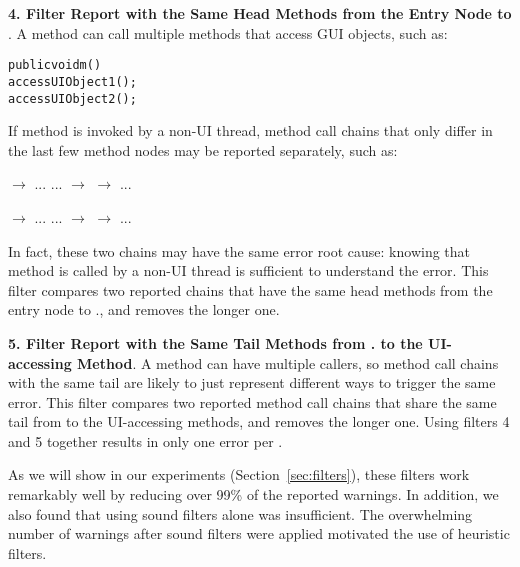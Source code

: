 \textbf{4. Filter Report with the Same Head Methods from the Entry Node to }. A method can call
multiple methods that access GUI objects, such as:

\pagebreak[3]
\vspace{-2mm}                   %
\begin{CodeOut}
\begin{alltt}
     public void m() \ttlcb
         accessUIObject1();
         accessUIObject2();
     \ttrcb
\end{alltt}
\end{CodeOut}
\vspace{-2mm}
If method  is invoked by a non-UI thread, method call chains that
only differ in the last few method nodes may be reported separately, such as:

 $\rightarrow$ ... ... $\rightarrow$  $\rightarrow$  ...

 $\rightarrow$ ... ... $\rightarrow$  $\rightarrow$  ...

In fact, these two chains may have the same error root cause: knowing that
method  is called by a non-UI thread is sufficient to understand
the error.
This filter compares two reported chains that have the same
head methods from the entry node to .,
and removes the longer one.

\textbf{5. Filter Report with the Same Tail Methods from .
to the UI-accessing Method}. A method
can have multiple callers, so method call chains with the same tail are likely
to just represent different ways to trigger the same error. This filter compares 
two reported method call chains that share the same 
tail from  to the UI-accessing methods, and
removes the longer one. Using filters 4 and 5 together results in
only one error per .



\vspace{1mm}

As we will show in our experiments (Section~\ref{sec:filters}), these filters
work remarkably well by reducing over 99\% of the reported warnings. In addition,
we also found that using sound filters alone was insufficient. The overwhelming
number of warnings after sound filters were applied motivated the use
of heuristic filters.



